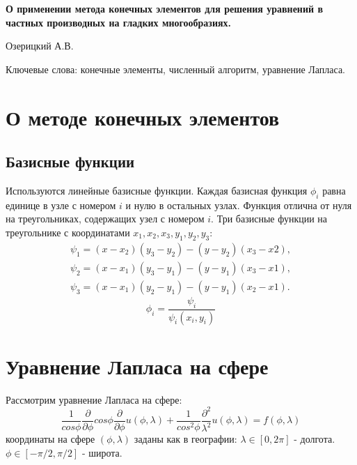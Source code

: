 \documentclass[a4paper,article]{article}
\begin{document}

{\bf \Large О применении метода конечных элементов для решения
  уравнений в частных производных на гладких многообразиях.}

\begin{center}
Озерицкий А.В.
\end{center}

\renewcommand{\abstractname}{}
\begin{abstract}
{\small
{}
В работе рассмотрено применение метода конечных элементов для
уравнений в частных производных, заданных на гладких многообразиях.
Рассмотренный подход позволяет решать уравнения в частных производных
на произвольных гладких многообразиях. 
В качестве примера рассматривается решение уравнения лапласа на сфере.}
\end{abstract}

Ключевые слова: конечные элементы, численный алгоритм, уравнение
Лапласа.

\section*{О методе конечных элементов}

\subsection*{Базисные  функции}
Используются линейные базисные функции. Каждая базисная функция
$\phi_i$ равна единице в узле с номером $i$ и нулю в остальных
узлах. Функция отлична от нуля на треугольниках, содержащих узел с
номером $i$. 
Три базисные функции на треугольнике с координатами $x_1,x_2,x_3, y_1,y_2,y_3$:
\begin{equation*}
\begin{split}
\psi_1=(x-x_2)(y_3-y_2)-(y-y_2)(x_3-x2),\\
\psi_2=(x-x_1)(y_3-y_1)-(y-y_1)(x_3-x1),\\
\psi_3=(x-x_1)(y_2-y_1)-(y-y_1)(x_2-x1).
\end{split}
\end{equation*} 
\begin{equation*}
\phi_i=\frac{\psi_i}{\psi_i(x_i,y_i)}
\end{equation*}

\section*{Уравнение Лапласа на сфере}
Рассмотрим уравнение Лапласа на сфере:
\begin{equation*}
\frac{1}{cos\phi}\frac{\partial}{\partial\phi}
cos\phi\frac{\partial}{\partial\phi} u(\phi, \lambda) +
\frac{1}{cos^2\phi}\frac{\partial^2}
{\lambda^2} u(\phi, \lambda) = f(\phi, \lambda)
\end{equation*}
координаты на сфере $(\phi,\lambda)$ заданы как в географии:
$\lambda \in [0,2\pi]$ - долгота. $\phi \in [-\pi/2,\pi/2]$ - широта.
\end{document}
